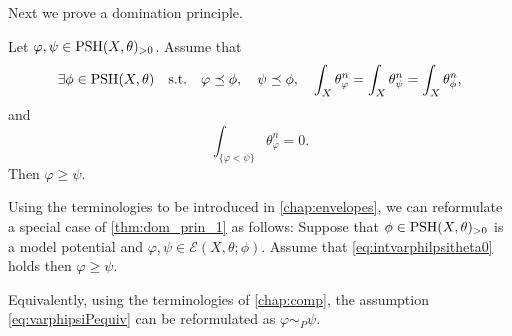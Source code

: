 Next we prove a domination principle.
\begin{theorem}\label{thm:dom_prin_1}
    Let $\varphi,\psi\in \mathrm{PSH}(X,\theta)_{>0}$. Assume that
    \begin{equation}\label{eq:varphipsiPequiv}
    \exists\phi\in \mathrm{PSH}(X,\theta)\quad \textup{s.t.} \quad \varphi\preceq \phi, \quad \psi\preceq \phi,\quad \int_X \theta_{\varphi}^n=\int_X \theta_{\psi}^n=\int_X \theta_{\phi}^n,
    \end{equation}
    and
    \begin{equation}\label{eq:intvarphilpsitheta0}
    \int_{\{\varphi<\psi\}} \theta_{\varphi}^n=0.
    \end{equation}
    Then $\varphi\geq \psi$.
\end{theorem}
\begin{remark}\label{rmk:npp:L982}
    Using the terminologies to be introduced in \cref{chap:envelopes}, we can reformulate a special case of \cref{thm:dom_prin_1} as follows: Suppose that $\phi\in \mathrm{PSH}(X,\theta)_{>0}$ is a model potential and $\varphi,\psi\in \mathcal{E}(X,\theta;\phi)$. Assume that \eqref{eq:intvarphilpsitheta0} holds then $\varphi\geq \psi$.

    Equivalently, using the terminologies of \cref{chap:comp}, the assumption \eqref{eq:varphipsiPequiv} can be reformulated as $\varphi\sim_P \psi$.
\end{remark}

